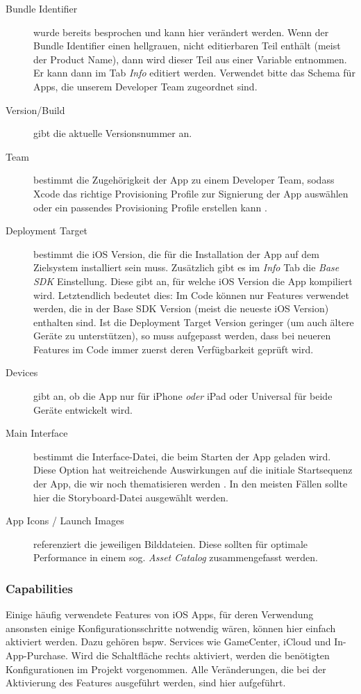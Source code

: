 \documentclass[parskip=half, final]{scrreprt}
\begin{document}
\begin{description}
\item[Bundle Identifier] wurde bereits besprochen und kann hier verändert werden. Wenn der Bundle Identifier einen hellgrauen, nicht editierbaren Teil enthält (meist der Product Name), dann wird dieser Teil aus einer Variable entnommen. Er kann dann im Tab \emph{Info} editiert werden. Verwendet bitte das Schema  für Apps, die unserem Developer Team zugeordnet sind.
\item[Version/Build] gibt die aktuelle Versionsnummer an.
\item[Team] bestimmt die Zugehörigkeit der App zu einem Developer Team, sodass Xcode das richtige Provisioning Profile zur Signierung der App auswählen oder ein passendes Provisioning Profile erstellen kann .
\item[Deployment Target] bestimmt die iOS Version, die für die Installation der App auf dem Zielsystem  installiert sein muss. Zusätzlich gibt es im \emph{Info} Tab die \emph{Base SDK} Einstellung. Diese gibt an, für welche iOS Version die App kompiliert wird. Letztendlich bedeutet dies: Im Code können nur Features verwendet werden, die in der Base SDK Version (meist die neueste iOS Version) enthalten sind. Ist die Deployment Target Version geringer (um auch ältere Geräte zu unterstützen), so muss aufgepasst werden, dass bei neueren Features im Code immer zuerst deren Verfügbarkeit geprüft wird.
\item[Devices] gibt an, ob die App nur für iPhone \emph{oder} iPad oder Universal für beide Geräte entwickelt wird.
\item[Main Interface] bestimmt die Interface-Datei, die beim Starten der App geladen wird. Diese Option hat weitreichende Auswirkungen auf die initiale Startsequenz der App, die wir noch thematisieren werden . In den meisten Fällen sollte hier die Storyboard-Datei ausgewählt werden.
\item[App Icons / Launch Images] referenziert die jeweiligen Bilddateien. Diese sollten für optimale Performance in einem sog. \emph{Asset Catalog} zusammengefasst werden.
\end{description}

\subsubsection{Capabilities}

Einige häufig verwendete Features von iOS Apps, für deren Verwendung ansonsten einige Konfigurationsschritte notwendig wären, können hier einfach aktiviert werden. Dazu gehören bspw. Services wie GameCenter, iCloud und In-App-Purchase. Wird die Schaltfläche rechts aktiviert, werden die benötigten Konfigurationen im Projekt vorgenommen. Alle Veränderungen, die bei der Aktivierung des Features ausgeführt werden, sind hier aufgeführt.
\end{document}
